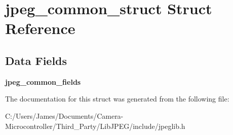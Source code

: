 \hypertarget{structjpeg__common__struct}{}\section{jpeg\+\_\+common\+\_\+struct Struct Reference}
\label{structjpeg__common__struct}
\subsection*{Data Fields}
\begin{DoxyCompactItemize}
\item 
\mbox{\label{structjpeg__common__struct_a9be75f402698aedbde0c0e499328af59}} 
{\bfseries jpeg\+\_\+common\+\_\+fields}
\end{DoxyCompactItemize}


The documentation for this struct was generated from the following file\+:\begin{DoxyCompactItemize}
\item 
C\+:/\+Users/\+James/\+Documents/\+Camera-\/\+Microcontroller/\+Third\+\_\+\+Party/\+Lib\+J\+P\+E\+G/include/jpeglib.\+h\end{DoxyCompactItemize}
